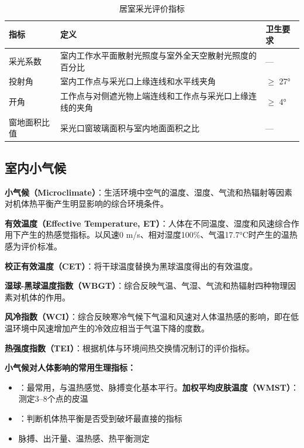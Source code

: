 \begin{table}[htbp]
\centering
\caption{居室采光评价指标}
\begin{tabularx}{\textwidth}{lXl}
\hline
\textbf{指标} & \textbf{定义} & \textbf{卫生要求} \\
\hline
采光系数 & 室内工作水平面散射光照度与室外全天空散射光照度的百分比 & — \\
投射角 & 室内工作点与采光口上缘连线和水平线夹角 & $\geq$ 27° \\
开角 & 工作点与对侧遮光物上端连线和工作点与采光口上缘连线的夹角 & $\geq$ 4° \\
窗地面积比值 & 采光口窗玻璃面积与室内地面面积之比 & — \\
\hline
\end{tabularx}
\end{table}

\subsection{室内小气候}

\begin{defbox}
\textbf{小气候（Microclimate）}：生活环境中空气的温度、湿度、气流和热辐射等因素对机体热平衡产生明显影响的综合环境条件。
\end{defbox}

\begin{defbox}
\textbf{有效温度（Effective Temperature, ET）}：人体在不同温度、湿度和风速综合作用下产生的热感觉指标。以风速0 m/s、相对湿度100\%、气温17.7°C时产生的温热感为评价标准。

\textbf{校正有效温度（CET）}：将干球温度替换为黑球温度得出的有效温度。

\textbf{湿球-黑球温度指数（WBGT）}：综合反映气温、气湿、气流和热辐射四种物理因素对机体的作用。

\textbf{风冷指数（WCI）}：综合反映寒冷气候下气温和风速对人体温热感的影响，即在低温环境中风速增加产生的冷效应相当于气温下降的度数。

\textbf{热强度指数（TEI）}：根据机体与环境间热交换情况制订的评价指标。
\end{defbox}

\textbf{小气候对人体影响的常用生理指标：}
\begin{itemize}[leftmargin=*]
    \item {}：最常用，与温热感觉、脉搏变化基本平行。\textbf{加权平均皮肤温度（WMST）}：测定3--8个点的皮温
    \item {}：判断机体热平衡是否受到破坏最直接的指标
    \item 脉搏、出汗量、温热感、热平衡测定
\end{itemize}

